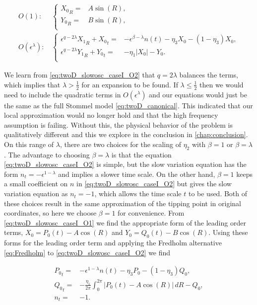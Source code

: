 \begin{align} \label{eq:twoD_slowosc_caseI_O1}
O(1):\, &\begin{cases}
	{X_0}_R =& A\sin(R), \\
	{Y_0}_R =& B\sin(R),\\
\end{cases}\\ \label{eq:twoD_slowosc_caseI_O2}
O(\epsilon^\lambda): \, & \begin{cases}
	\epsilon^{q-2\lambda}{X_1}_R+{X_0}_t =& -\epsilon^{\beta-\lambda} n(t) -\eta_3 X_0-(1-\eta_3)X_0, \\
	\epsilon^{q-2\lambda}{Y_1}_R+{Y_0}_t =& -\eta_1|X_0|-Y_0.\\
\end{cases}
\end{align}

We learn from \eqref{eq:twoD_slowosc_caseI_O2} that $q= 2\lambda$ balances the terms, which implies that $\lambda> \frac{1}{2}$ for an expansion to be found. If $\lambda\le \frac{1}{2}$ then we would need to include the quadratic terms in $O(\epsilon^\lambda)$ and our equations would just be the same as the full Stommel model \eqref{eq:twoD_canonical}. This indicated that our local approximation would no longer hold and that the high frequency assumption is failing. Without this, the physical behavior of the problem is qualitatively different and this we explore in the conclusion in \autoref{chap:conclusion}. On this range of $\lambda$, there are two choices for the scaling of $\eta_2$ with $\beta=1$ or $\beta=\lambda$. The advantage to choosing $\beta=\lambda$ is that the equation \eqref{eq:twoD_slowosc_caseI_O2} is simple, but the slow variation equation has the form $n_t = -\epsilon^{1-\lambda}$ and implies a slower time scale. On the other hand, $\beta=1$ keeps a small coefficient on $n$ in \eqref{eq:twoD_slowosc_caseI_O2} but gives the slow variation equation as $n_t=-1$, which allows the time scale $t$ to be used. Both of these choices result in the same approximation of the tipping point in original coordinates, so here we choose $\beta=1$ for convenience. From \eqref{eq:twoD_slowosc_caseI_O1} we find the appropriate form of the leading order terms, $X_0=P_0(t)-A\cos(R)$ and $Y_0=Q_0(t)-B\cos(R)$. Using these forms for the leading order term and applying the Fredholm alternative \eqref{eq:Fredholm} to \eqref{eq:twoD_slowosc_caseI_O2} we find 

\begin{equation}\label{eq:twoD_slowosc_caseI_fullinner}
\begin{aligned}
{P_0}_t =& -\epsilon^{1-\lambda} n(t) -\eta_3 P_0-(1-\eta_3)Q_0, \\
{Q_0}_t =& -\frac{\eta_1}{2\pi}\int_0^{2\pi}|P_0(t)-A\cos(R)|\,dR-Q_0,\\
n_t =& -1.
\end{aligned}
\end{equation}

